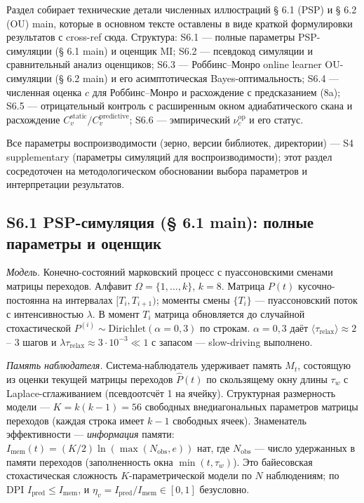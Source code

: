 \documentclass[pdflatex,sn-mathphys-ay]{sn-jnl}
\begin{document}
Раздел собирает технические детали численных иллюстраций § 6.1 (PSP) и § 6.2 (OU) main, которые в основном тексте оставлены в виде краткой формулировки результатов с cross-ref сюда. Структура: S6.1 --- полные параметры PSP-симуляции (§ 6.1 main) и оценщик MI; S6.2 --- псевдокод симуляции и сравнительный анализ оценщиков; S6.3 --- Роббинс--Монро online learner OU-симуляции (§ 6.2 main) и его асимптотическая Bayes-оптимальность; S6.4 --- численная оценка \(c\) для Роббинс--Монро и расхождение с предсказанием (8a); S6.5 --- отрицательный контроль с расширенным окном адиабатического скана и расхождение \(C_v^{\text{static}}/ C_v^{\text{predictive}}\); S6.6 --- эмпирический \(\nu_c^{\text{op}}\) и его статус.



Все параметры воспроизводимости (зерно, версии библиотек, директории) --- S4 supplementary (параметры симуляций для воспроизводимости); этот раздел сосредоточен на методологическом обосновании выбора параметров и интерпретации результатов.



\subsection*{S6.1 PSP-симуляция (§ 6.1 main): полные параметры и оценщик}\label{s6.1-psp-ux441ux438ux43cux443ux43bux44fux446ux438ux44f-6.1-main-ux43fux43eux43bux43dux44bux435-ux43fux430ux440ux430ux43cux435ux442ux440ux44b-ux438-ux43eux446ux435ux43dux449ux438ux43a}



\emph{Модель.} Конечно-состояний марковский процесс с пуассоновскими сменами матрицы переходов. Алфавит \(\Omega = \{1, \ldots, k\}\), \(k = 8\). Матрица \(P(t)\) кусочно-постоянна на интервалах \([T_i, T_{i+1})\); моменты смены \(\{T_i\}\) --- пуассоновский поток с интенсивностью \(\lambda\). В момент \(T_i\) матрица обновляется до случайной стохастической \(P^{(i)} \sim \text{Dirichlet}(\alpha = 0{,}3)\) по строкам. \(\alpha = 0{,}3\) даёт \(\langle \tau_{\text{relax}} \rangle \approx 2\)-- \(3\) шагов и \(\lambda \tau_{\text{relax}} \approx 3 \cdot 10^{-3} \ll 1\) с запасом --- slow-driving выполнено.



\emph{Память наблюдателя.} Система-наблюдатель удерживает память \(M_t\), состоящую из оценки текущей матрицы переходов \(\hat{P}(t)\) по скользящему окну длины \(\tau_w\) с Laplace-сглаживанием (псевдоотсчёт 1 на ячейку). Структурная размерность модели --- \(K = k(k-1) = 56\) свободных внедиагональных параметров матрицы переходов (каждая строка имеет \(k-1\) свободных ячеек). Знаменатель эффективности --- \emph{информация} памяти: \(I_{\text{mem}}(t) = (K/2)\ln(\max(N_{\text{obs}}, e))\) нат, где \(N_{\text{obs}}\) --- число удержанных в памяти переходов (заполненность окна \(\min(t, \tau_w)\)). Это байесовская стохастическая сложность \(K\)-параметрической модели по \(N\) наблюдениям; по DPI \(I_{\text{pred}} \le I_{\text{mem}}\), и \(\eta_v = I_{\text{pred}}/I_{\text{mem}} \in [0,1]\) безусловно.
\end{document}
